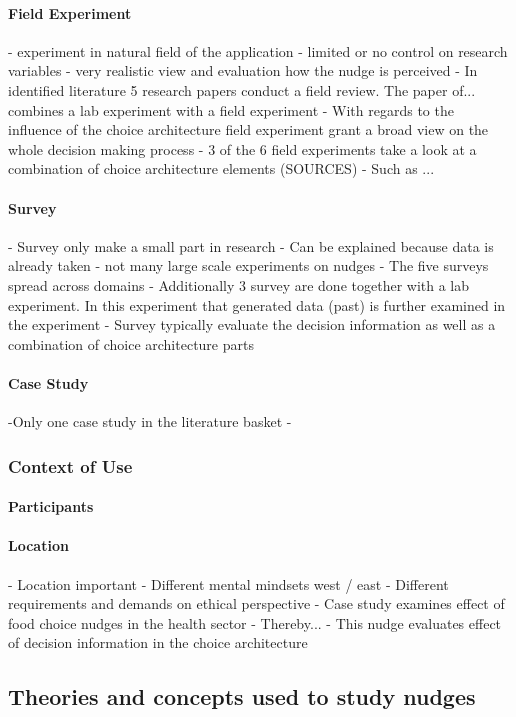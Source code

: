 \paragraph{Field Experiment} %
- experiment in natural field of the application
- limited or no control on research variables
- very realistic view and evaluation how the nudge is perceived
- In identified literature 5 research papers conduct a field review. The paper of... combines a lab experiment with a field experiment
- With regards to the influence of the choice architecture field experiment grant a broad view on the whole decision making process
- 3 of the 6 field experiments take a look at a combination of choice architecture elements (SOURCES)
- Such as ... 
\paragraph{Survey} %
- Survey only make a small part in research
- Can be explained because data is already taken - not many large scale experiments on nudges
- The five surveys spread across domains
- Additionally 3 survey are done together with a lab experiment. In this experiment that generated data (past) is further examined in the experiment
- Survey typically evaluate the decision information as well as a combination of choice architecture parts
\paragraph{Case Study}  %
-Only one case study in the literature basket
- 
\subsubsection{Context of Use}
\paragraph{Participants} %
\paragraph{Location} %
- Location important
- Different mental mindsets west / east
- Different requirements and demands on ethical perspective
- Case study \cite{guthrie_nudging_2015} examines effect of food choice nudges in the health sector
- Thereby...
- This nudge evaluates effect of decision information in the choice architecture


\subsection{Theories and concepts used to study nudges}

